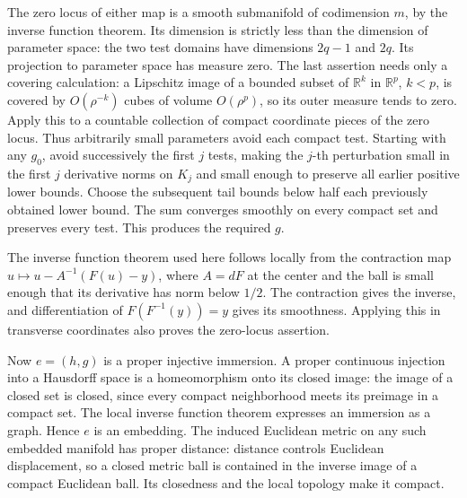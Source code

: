 \documentclass[
  11pt,
]{article}
\begin{document}
The zero locus of either map is a smooth submanifold of codimension
\(m\), by the inverse function theorem. Its dimension is strictly less
than the dimension of parameter space: the two test domains have
dimensions \(2q-1\) and \(2q\). Its projection to parameter space has
measure zero. The last assertion needs only a covering calculation: a
Lipschitz image of a bounded subset of \(\mathbb R^k\) in
\(\mathbb R^p\), \(k<p\), is covered by \(O(\rho^{-k})\) cubes of volume
\(O(\rho^p)\), so its outer measure tends to zero. Apply this to a
countable collection of compact coordinate pieces of the zero locus.
Thus arbitrarily small parameters avoid each compact test. Starting with
any \(g_0\), avoid successively the first \(j\) tests, making the
\(j\)-th perturbation small in the first \(j\) derivative norms on
\(K_j\) and small enough to preserve all earlier positive lower bounds.
Choose the subsequent tail bounds below half each previously obtained
lower bound. The sum converges smoothly on every compact set and
preserves every test. This produces the required \(g\).

The inverse function theorem used here follows locally from the
contraction map \(u\mapsto u-A^{-1}(F(u)-y)\), where \(A=dF\) at the
center and the ball is small enough that its derivative has norm below
\(1/2\). The contraction gives the inverse, and differentiation of
\(F(F^{-1}(y))=y\) gives its smoothness. Applying this in transverse
coordinates also proves the zero-locus assertion.

Now \(e=(h,g)\) is a proper injective immersion. A proper continuous
injection into a Hausdorff space is a homeomorphism onto its closed
image: the image of a closed set is closed, since every compact
neighborhood meets its preimage in a compact set. The local inverse
function theorem expresses an immersion as a graph. Hence \(e\) is an
embedding. The induced Euclidean metric on any such embedded manifold
has proper distance: distance controls Euclidean displacement, so a
closed metric ball is contained in the inverse image of a compact
Euclidean ball. Its closedness and the local topology make it compact.
\end{document}
